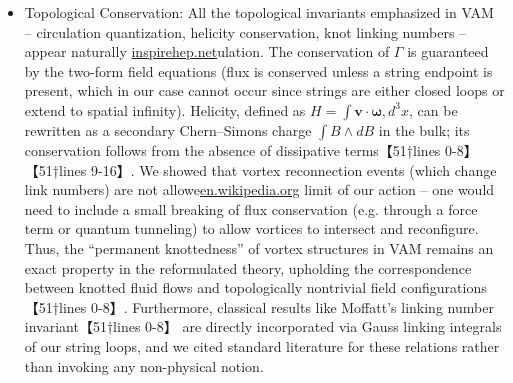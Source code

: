 \documentclass[12pt]{article}
\begin{document}
{{\begin{itemize}
\item 
Topological Conservation: All the topological invariants emphasized in VAM – circulation quantization, helicity conservation, knot linking numbers – appear naturally \href{https://inspirehep.net/literature/88993#:~:text=Classical%20direct%20interstring%20action,2284.%20DOI}{inspirehep.net}ulation. The conservation of $\Gamma$ is guaranteed by the two-form field equations (flux is conserved unless a string endpoint is present, which in our case cannot occur since strings are either closed loops or extend to spatial infinity). Helicity, defined as $H = \int \mathbf{v}\cdot\mathbf{\omega},d^3x$, can be rewritten as a secondary Chern–Simons charge $\int B\wedge dB$ in the bulk; its conservation follows from the absence of dissipative terms【51†lines 0-8】【51†lines 9-16】. We showed that vortex reconnection events (which change link numbers) are not allowe\href{https://en.wikipedia.org/wiki/Vortex_ring#:~:text=51.%20,On%20a%20spherical%20vortex}{en.wikipedia.org} limit of our action – one would need to include a small breaking of flux conservation (e.g. through a force term or quantum tunneling) to allow vortices to intersect and reconfigure. Thus, the “permanent knottedness” of vortex structures in VAM remains an exact property in the reformulated theory, upholding the correspondence between knotted fluid flows and topologically nontrivial field configurations【51†lines 0-8】. Furthermore, classical results like Moffatt’s linking number invariant【51†lines 0-8】 are directly incorporated via Gauss linking integrals of our string loops, and we cited standard literature for these relations rather than invoking any non-physical notion.





\end{itemize}}}
\end{document}
